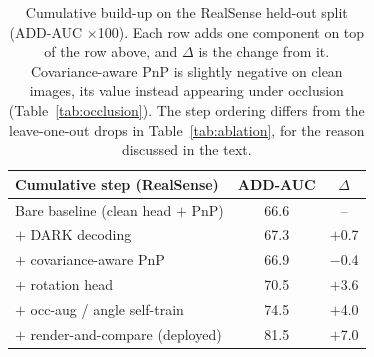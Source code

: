 \begin{table}[t!]
\centering
\renewcommand{\arraystretch}{1.1}
\setlength{\tabcolsep}{6pt}
\begin{tabular}{@{} l cc @{}}
\toprule
\textbf{Cumulative step (RealSense)} & \textbf{ADD-AUC} & $\Delta$ \\
\midrule
Bare baseline (clean head $+$ PnP) & 66.6 & -- \\
$+$ DARK decoding & 67.3 & $+$0.7 \\
$+$ covariance-aware PnP & 66.9 & $-$0.4 \\
$+$ rotation head & 70.5 & $+$3.6 \\
$+$ occ-aug / angle self-train & 74.5 & $+$4.0 \\
$+$ render-and-compare (deployed) & 81.5 & $+$7.0 \\
\bottomrule
\end{tabular}
\caption{Cumulative build-up on the RealSense held-out split (ADD-AUC $\times$100). Each row adds one component on top of the row above, and $\Delta$ is the change from it. Covariance-aware PnP is slightly negative on clean images, its value instead appearing under occlusion (Table~\ref{tab:occlusion}). The step ordering differs from the leave-one-out drops in Table~\ref{tab:ablation}, for the reason discussed in the text.}
\label{tab:buildup}
\end{table}

